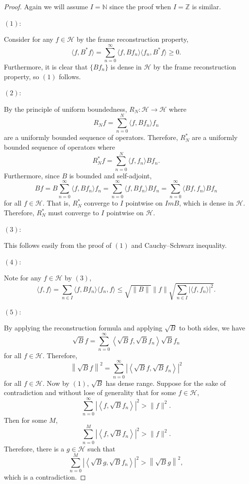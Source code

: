 \documentclass[11pt]{amsart}
\theoremstyle{definition}
\numberwithin{equation}{section}
\newcommand{\Hcal}{\mathcal{H}} %
\begin{document}
\begin{proof}
Again we will assume $I=\mathbb{N}$ since the proof when $I=\mathbb{Z}$ is similar.

$(1)$:

Consider for any $f\in \Hcal$ by the frame reconstruction property, $$\langle f,B^{*}f\rangle= \sum_{n=0}^{\infty}\langle f, Bf_n\rangle \langle f_n, B^{*}f\rangle \geq 0.$$
Furthermore, it is clear that $\{Bf_n\}$ is dense in $\mathcal{H}$ by the frame reconstruction property, so $(1)$ follows.

$(2)$:

By the principle of uniform boundedness, $R_{N}: \Hcal \to \Hcal$ where
$$R_{N}f=\sum_{n=0}^{N}\langle f, Bf_n\rangle f_n$$ are a uniformly bounded sequence of operators. Therefore,
$R_{N}^{*}$ are a uniformly bounded sequence of operators where
$$R_{N}^{*}f=\sum_{n=0}^{N}\langle f ,f_n\rangle Bf_n.$$ Furthermore, since $B$ is bounded and self-adjoint,
$$Bf=B\sum_{n=0}^{\infty}\langle f, Bf_n\rangle f_n=\sum_{n=0}^{\infty}\langle f, Bf_n\rangle Bf_n=\sum_{n=0}^{\infty}\langle Bf, f_n\rangle Bf_n$$
for all $f\in \Hcal.$ That is, $R_{N}^{*}$ converge to $I$ pointwise on $ImB$, which is dense in $\Hcal$. Therefore, $R_{N}^{*}$ must converge to $I$ pointwise on $\Hcal$.

$(3):$

This follows easily from the proof of $(1)$ and Cauchy–Schwarz inequality.

$(4):$

Note for any $f\in \Hcal$ by $(3)$,
$$\langle f, f\rangle=\sum_{n\in I}\langle f, Bf_n\rangle \langle f_n, f\rangle  \leq \sqrt{\|B\|}\|f\| \sqrt{\sum_{n\in I}|\langle f, f_{n}\rangle|^{2}}.$$

$(5):$

By applying the reconstruction formula and applying $\sqrt{B}$ to both sides, we have
$$\sqrt{B}f=\sum_{n=0}^{\infty}\left\langle \sqrt{B}f, \sqrt{B}f_n \right\rangle \sqrt{B}f_n$$
for all $f\in \mathcal{H}$. Therefore, 
$$\left \|\sqrt{B}f \right\|^{2}=\sum_{n=0}^{\infty}\left|\left\langle \sqrt{B}f, \sqrt{B}f_n \right\rangle \right|^{2}$$
for all $f\in \mathcal{H}$. Now by $(1)$, $\sqrt{B}$ has dense range. Suppose for the sake of contradiction and without lose of generality that for some $f\in \mathcal{H}$,
$$\sum_{n=0}^{\infty}\left|\left\langle f, \sqrt{B}f_n \right\rangle \right|^{2}>\|f\|^{2}.$$
Then for some $M$,
$$\sum_{n=0}^{M}\left|\left\langle f, \sqrt{B}f_n \right\rangle \right|^{2}>\|f\|^{2}.$$
Therefore, there is a $g\in \mathcal{H}$ such that
$$\sum_{n=0}^{M}\left|\left\langle \sqrt{B}g, \sqrt{B}f_n \right\rangle \right|^{2}> \left \|\sqrt{B}g \right\|^{2},$$ which is a contradiction. 
\end{proof}
\end{document}
